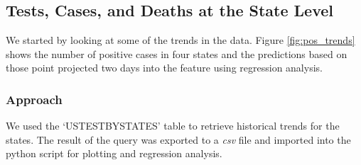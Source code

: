 \documentclass[11pt]{article}
\begin{document}
\subsection{Tests, Cases, and Deaths at the State Level}

\noindent
We started by looking at some of the trends in the data. Figure \ref{fig:pos_trends} shows the number of positive cases in four states and the predictions based on those point projected two days into the feature using regression analysis.
\subsubsection{Approach}
We used the `USTESTBYSTATES' table to retrieve historical trends for the states. The result of the query was exported to a \textit{csv} file and imported into the python script for plotting and regression analysis.
\end{document}
